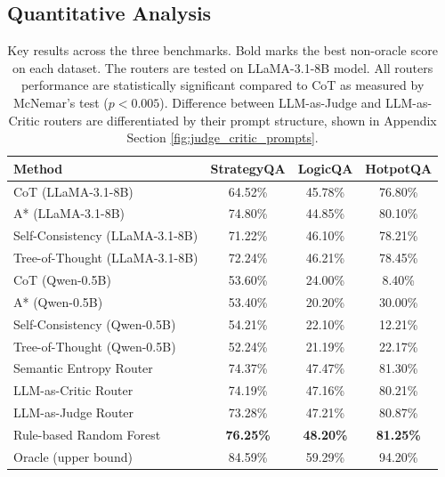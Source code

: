 \documentclass[11pt]{article}
\begin{document}
\subsection{Quantitative Analysis}
\label{sec:quantitative}

\begin{table}[t]
\centering
\small
\begin{tabular}{lccc}
\toprule
\textbf{Method} & \textbf{StrategyQA} & \textbf{LogicQA} & \textbf{HotpotQA} \\
\midrule
CoT (LLaMA-3.1-8B)           & 64.52\% & 45.78\% & 76.80\% \\
A* (LLaMA-3.1-8B)            & 74.80\% & 44.85\% & 80.10\% \\

Self-Consistency (LLaMA-3.1-8B) & 71.22\% & 46.10\% & 78.21\% \\

Tree-of-Thought (LLaMA-3.1-8B) & 72.24\% & 46.21\% & 78.45\% \\

\midrule
CoT (Qwen-0.5B)              & 53.60\% & 24.00\% &  8.40\% \\
A* (Qwen-0.5B)               & 53.40\% & 20.20\% & 30.00\% \\
Self-Consistency (Qwen-0.5B) & 54.21\% & 22.10\% & 12.21\% \\
Tree-of-Thought (Qwen-0.5B) & 52.24\% & 21.19\% & 22.17\% \\
\midrule
Semantic Entropy Router      & 74.37\% & 47.47\% & 81.30\% \\
LLM-as-Critic Router         & 74.19\% & 47.16\% & 80.21\% \\
LLM-as-Judge Router          & 73.28\% & 47.21\%      & 80.87\% \\
Rule-based Random Forest     & \textbf{76.25\%} & \textbf{48.20\%} & \textbf{81.25\%} \\
\midrule
Oracle (upper bound)         & 84.59\% & 59.29\% & 94.20\% \\
\bottomrule
\end{tabular}
\caption{Key results across the three benchmarks. Bold marks the best non-oracle score on each dataset. The routers are tested on LLaMA-3.1-8B model. All routers performance are statistically significant compared to CoT as measured by McNemar's test ($p<0.005$). Difference between LLM-as-Judge and LLM-as-Critic routers are differentiated by their prompt structure, shown in Appendix Section \ref{fig:judge_critic_prompts}.}
\label{tab:main}
\end{table}
\end{document}
